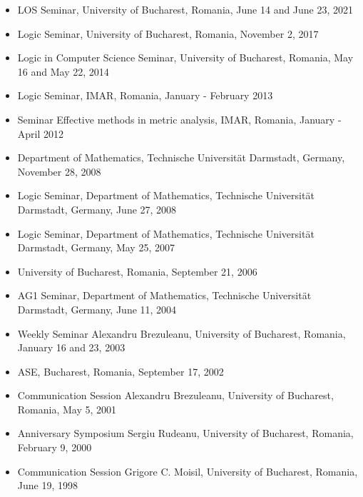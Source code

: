 \documentclass[12pt]{article}
\newcommand{\tud}{Technische Universit\" at Darmstadt, Germany}
\begin{document}
\begin{itemize}

\item LOS Seminar, University of Bucharest, Romania, June 14 and June 23, 2021

\item Logic Seminar, University of Bucharest, Romania, November 2, 2017

\item Logic in Computer Science Seminar, University of Bucharest, Romania, May 16 and May 22, 2014

\item  Logic Seminar, IMAR, Romania, January - February 2013

\item Seminar Effective methods in metric analysis,  IMAR,  Romania, January - April 2012



\item Department of Mathematics, Technische Universit\" at Darmstadt,  Germany, November 28, 2008

\item  Logic Seminar, Department of Mathematics, Technische Universit\" at Darmstadt,  Germany, June 27, 2008
 
\item Logic Seminar, Department of Mathematics, Technische Universit\" at Darmstadt,  Germany, May 25, 2007
 
\item  University of  Bucharest, Romania, September 21, 2006
 
\item  AG1 Seminar, Department of Mathematics, Technische Universit\" at Darmstadt,  Germany, June 11, 2004
 
\item  Weekly Seminar Alexandru Brezuleanu, University of  Bucharest, Romania, January 16 and 23, 2003

\item  ASE, Bucharest, Romania, September 17, 2002

\item Communication Session Alexandru Brezuleanu, University of  Bucharest, Romania,  May  5, 2001

\item Anniversary Symposium Sergiu Rudeanu, University of Bucharest, Romania, February 9, 2000

\item  Communication Session Grigore  C. Moisil, University of Bucharest, Romania, June 19, 1998
 
 
\end{itemize}
\end{document}
